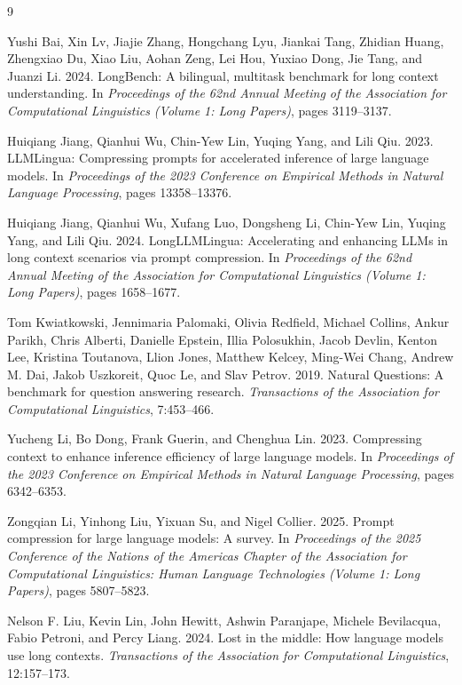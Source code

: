 \documentclass[10pt,a4paper,twocolumn]{article}
\begin{document}
\begin{thebibliography}{9}

Yushi Bai, Xin Lv, Jiajie Zhang, Hongchang Lyu, Jiankai Tang, Zhidian Huang, Zhengxiao Du, Xiao Liu, Aohan Zeng, Lei Hou, Yuxiao Dong, Jie Tang, and Juanzi Li. 2024.
\newblock LongBench: A bilingual, multitask benchmark for long context understanding.
\newblock In \emph{Proceedings of the 62nd Annual Meeting of the Association for Computational Linguistics (Volume 1: Long Papers)}, pages 3119--3137.

Huiqiang Jiang, Qianhui Wu, Chin-Yew Lin, Yuqing Yang, and Lili Qiu. 2023.
\newblock LLMLingua: Compressing prompts for accelerated inference of large language models.
\newblock In \emph{Proceedings of the 2023 Conference on Empirical Methods in Natural Language Processing}, pages 13358--13376.

Huiqiang Jiang, Qianhui Wu, Xufang Luo, Dongsheng Li, Chin-Yew Lin, Yuqing Yang, and Lili Qiu. 2024.
\newblock LongLLMLingua: Accelerating and enhancing LLMs in long context scenarios via prompt compression.
\newblock In \emph{Proceedings of the 62nd Annual Meeting of the Association for Computational Linguistics (Volume 1: Long Papers)}, pages 1658--1677.

Tom Kwiatkowski, Jennimaria Palomaki, Olivia Redfield, Michael Collins, Ankur Parikh, Chris Alberti, Danielle Epstein, Illia Polosukhin, Jacob Devlin, Kenton Lee, Kristina Toutanova, Llion Jones, Matthew Kelcey, Ming-Wei Chang, Andrew M. Dai, Jakob Uszkoreit, Quoc Le, and Slav Petrov. 2019.
\newblock Natural Questions: A benchmark for question answering research.
\newblock \emph{Transactions of the Association for Computational Linguistics}, 7:453--466.

Yucheng Li, Bo Dong, Frank Guerin, and Chenghua Lin. 2023.
\newblock Compressing context to enhance inference efficiency of large language models.
\newblock In \emph{Proceedings of the 2023 Conference on Empirical Methods in Natural Language Processing}, pages 6342--6353.

Zongqian Li, Yinhong Liu, Yixuan Su, and Nigel Collier. 2025.
\newblock Prompt compression for large language models: A survey.
\newblock In \emph{Proceedings of the 2025 Conference of the Nations of the Americas Chapter of the Association for Computational Linguistics: Human Language Technologies (Volume 1: Long Papers)}, pages 5807--5823.

Nelson F. Liu, Kevin Lin, John Hewitt, Ashwin Paranjape, Michele Bevilacqua, Fabio Petroni, and Percy Liang. 2024.
\newblock Lost in the middle: How language models use long contexts.
\newblock \emph{Transactions of the Association for Computational Linguistics}, 12:157--173.

\end{thebibliography}
\end{document}
